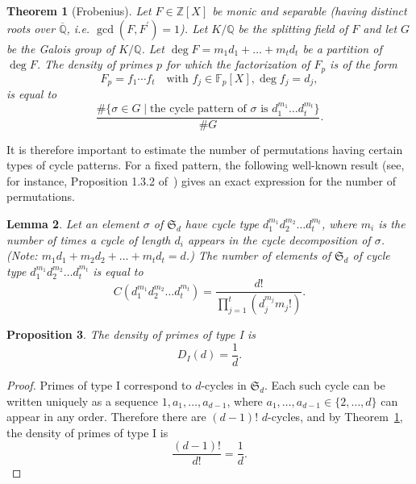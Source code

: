 \documentclass[11pt]{article}
\theoremstyle{plain}
\newtheorem{theorem}{Theorem}[section]
\newtheorem{lemma}[theorem]{Lemma}
\newtheorem{proposition}[theorem]{Proposition}
\theoremstyle{definition}
\theoremstyle{remark}
\numberwithin{equation}{section}
\newcommand{\ZZ}{\mathbb{Z}}
\newcommand{\FF}{\mathbb{F}}
\newcommand{\QQ}{\mathbb{Q}}
\renewcommand{\SS}{\mathfrak{S}}
\begin{document}
\begin{theorem}[Frobenius]\label{thm:frobenius}
  Let $F\in\ZZ[X]$ be monic and separable (having distinct roots over
  $\overline{\QQ}$, i.e. $\gcd(F, F^\prime)=1$).  Let $K/\QQ$ be the splitting
  field of $F$ and let $G$ be the Galois group of $K/\QQ$.  
  Let $\deg F=m_1d_1+\ldots+m_td_t$ be a partition of $\deg F$.  
  The density of primes $p$ for which the factorization of $F_p$ is of the
  form
  \begin{equation*}
    F_p=f_1\cdots f_t\quad\text{with }f_j\in\FF_p[X], \deg f_j=d_j,
  \end{equation*}
  is equal to
  \begin{equation*}
    \frac{\#\{\sigma\in G\mid\text{the cycle pattern of $\sigma$ is 
    $d_1^{m_1}\ldots d_t^{m_t}$}\}
    }{\# G}.
  \end{equation*}
\end{theorem}

It is therefore important to estimate the number of permutations having
certain types of cycle patterns.  For a fixed pattern, the following
well-known result 
(see, for instance, Proposition 1.3.2 of~\cite{Stanley1}) gives an exact
expression for the number of permutations.

\begin{lemma}\label{lem:cycletype}
  Let an element $\sigma$ of $\SS_d$ have cycle type $d_1^{m_1}d_2^{m_2}\ldots d_t^{m_t}$, 
  where $m_i$ is the number of times a cycle of length $d_i$ appears in the cycle
  decomposition of $\sigma$. (Note: $m_1d_1+m_2d_2+\ldots +m_td_t=d$.) The number
   of elements of $\SS_d$ of cycle type $d_1^{m_1}d_2^{m_2}\ldots d_t^{m_t}$ is equal to
  \begin{equation*}
    C(d_1^{m_1}d_2^{m_2}\ldots d_t^{m_t})=\frac{d!}{\prod_{j=1}^t\left(d_j^{m_j}m_j!\right)}.
  \end{equation*}
\end{lemma}


\begin{proposition}\label{prop:type1}
  The density of primes of type I is 
  \begin{equation*}
    D_I(d)=\frac{1}{d}.
  \end{equation*}
\end{proposition}
\begin{proof}
  Primes of type I correspond to $d$-cycles in $\SS_d$.  Each such cycle can
  be written uniquely as a sequence $1,a_1,\ldots,a_{d-1}$, where
  $a_1,\ldots,a_{d-1}\in\{2,\ldots,d\}$ can appear in any order.  Therefore
  there are $(d-1)!$ $d$-cycles, and by Theorem~\ref{thm:frobenius},
  the density of primes of type I is
  \begin{equation*}
    \frac{(d-1)!}{d!}=\frac{1}{d}.
  \end{equation*}
\end{proof}
\end{document}
